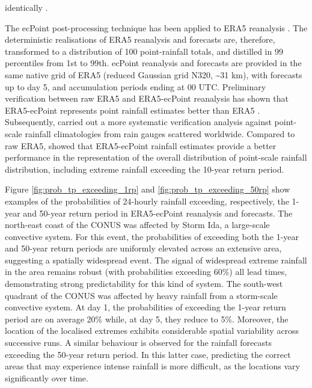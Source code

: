 identically \citep{Pillosu_2025}. 

The  ecPoint post-processing technique has been applied to ERA5 reanalysis \citep{Bottazzi_2024}. The deterministic realisations of ERA5 reanalysis and forecasts are, therefore, transformed to a distribution of 100 point-rainfall totals, and distilled in 99 percentiles from 1st to 99th. ecPoint reanalysis and forecasts are provided in the same native grid of ERA5 (reduced Gaussian grid N320, \sim31 km), with forecasts up to day 5, and accumulation periods ending at 00 UTC. Preliminary verification between raw ERA5 and ERA5-ecPoint reanalysis has shown that ERA5-ecPoint represents point rainfall estimates better than ERA5 \citep{Hewson_2023}. Subsequently, \citet{Pillosu_2025a} carried out a more systematic verification analysis against point-scale rainfall climatologies from rain gauges scattered worldwide. Compared to raw ERA5, \citet{Pillosu_2025a} showed that ERA5-ecPoint rainfall estimates provide a better performance in the representation of the overall distribution of point-scale rainfall distribution, including extreme rainfall exceeding the 10-year return period.

Figure  \ref{fig:prob_tp_exceeding_1rp} and \ref{fig:prob_tp_exceeding_50rp} show examples of the probabilities of 24-hourly rainfall exceeding, respectively, the 1-year and 50-year return period in ERA5-ecPoint reanalysis and forecasts. The north-east coast of the CONUS was affected by Storm Ida, a large-scale convective system. For this event, the probabilities of exceeding both the 1-year and 50-year return periods are uniformly elevated across an extensive area, suggesting a spatially widespread event. The signal of widespread extreme rainfall in the area remains robust (with probabilities exceeding 60\%) all lead times, demonstrating strong predictability for this kind of system. The south-west quadrant of the CONUS was affected by heavy rainfall from a storm-scale convective system. At day 1, the probabilities of exceeding the 1-year return period are on average 20\% while, at day 5, they reduce to 5\%. Moreover, the location of the localised extremes exhibits considerable spatial variability across successive runs. A similar behaviour is observed for the rainfall forecasts exceeding the 50-year return period. In this latter case, predicting the correct areas that may experience intense rainfall is more difficult, as the locations vary significantly over time.

